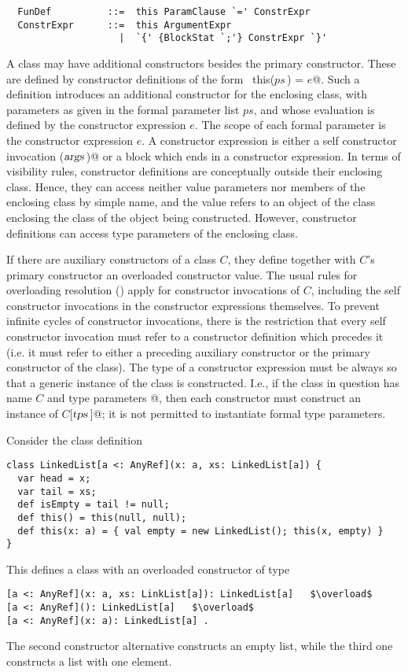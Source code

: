 \documentclass[a4paper,12pt,twoside,titlepage]{book}
\newcommand{\tps}{\mbox{\sl tps}}
\newcommand{\args}{\mbox{\sl args}}
\begin{document}
\syntax\begin{lstlisting}
  FunDef          ::=  this ParamClause `=' ConstrExpr
  ConstrExpr      ::=  this ArgumentExpr
                    |  `{' {BlockStat `;'} ConstrExpr `}'
\end{lstlisting}

A class may have additional constructors besides the primary
constructor.  These are defined by constructor definitions of the form
~\lstinline@def this($ps\,$) = $e$@.  Such a definition introduces an additional
constructor for the enclosing class, with parameters as given in the
formal parameter list $ps$, and whose evaluation is defined by
the constructor expression $e$.  The scope of each formal
parameter is the constructor expression $e$.  A constructor
expression is either a self constructor invocation \lstinline@this($\args\,$)@
or a block which ends in a constructor expression.  In terms of
visibility rules, constructor definitions are conceptually outside
their enclosing class.  Hence, they can access neither value
parameters nor members of the enclosing class by simple name, and the
value  refers to an object of the class enclosing the class
of the object being constructed. However, constructor definitions can
access type parameters of the enclosing class.

If there are auxiliary constructors of a class $C$, they define
together with $C$'s primary constructor an overloaded constructor
value. The usual rules for overloading resolution
() apply for constructor invocations of $C$,
including the self constructor invocations in the constructor
expressions themselves. To prevent infinite cycles of constructor
invocations, there is the restriction that every self constructor
invocation must refer to a constructor definition which precedes it
(i.e. it must refer to either a preceding auxiliary constructor or the
primary constructor of the class).  The type of a constructor
expression must be always so that a generic instance of the class is
constructed.  I.e., if the class in question has name $C$ and type
parameters \lstinline@[$\tps\,$]@, then each constructor must construct an
instance of \lstinline@$C$[$\tps\,$]@; it is not permitted to instantiate formal
type parameters.

\example Consider the class definition

\begin{lstlisting}
class LinkedList[a <: AnyRef](x: a, xs: LinkedList[a]) {
  var head = x;
  var tail = xs;
  def isEmpty = tail != null;  
  def this() = this(null, null);
  def this(x: a) = { val empty = new LinkedList(); this(x, empty) }
}
\end{lstlisting}
This defines a class  with an overloaded constructor of type
\begin{lstlisting}
[a <: AnyRef](x: a, xs: LinkList[a]): LinkedList[a]   $\overload$
[a <: AnyRef](): LinkedList[a]   $\overload$
[a <: AnyRef](x: a): LinkedList[a] .
\end{lstlisting}
The second constructor alternative constructs an empty list, while the
third one constructs a list with one element.
\end{document}
